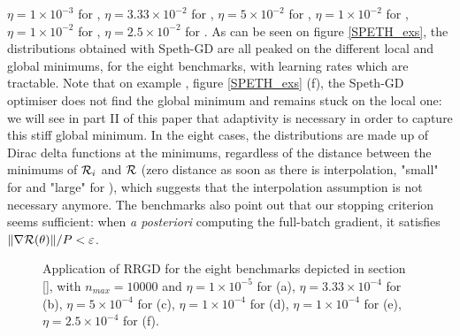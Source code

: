 $\eta = 1\times 10^{-3}$ for \exThree, 
$\eta = 3.33\times 10^{-2}$ for \exFour, 
$\eta = 5 \times 10^{-2}$ for \exFive, 
$\eta = 1 \times 10^{-2}$ for \exSix, 
$\eta = 1 \times 10^{-2}$ for \exSeven, 
$\eta = 2.5 \times 10^{-2}$ for \exHeight. 
As can be seen on figure \ref{SPETH_exs}, the distributions obtained with Speth-GD are all peaked on the different local and global minimums, for the eight benchmarks, with learning
rates which are tractable. Note that on example \exHeight, figure \ref{SPETH_exs} (f), the Speth-GD optimiser does not find the global minimum and remains stuck on the local one:
we will see in part II of this paper that adaptivity is necessary in order to capture this stiff global minimum.  
In the eight cases, the distributions are made up of Dirac delta functions at the minimums, regardless of the distance between the minimums of $\mathcal{R}_i$ and $\mathcal{R}$ (zero distance as
soon as there is interpolation, "small" for \exThree and "large" for \exFour), which suggests that the interpolation assumption is not necessary anymore. 
The benchmarks also point out that
our stopping criterion seems sufficient: when {\em a posteriori} computing the full-batch gradient, it satisfies $\|\nabla \mathcal{R}(\theta)\|/P<\varepsilon$. \\
\begin{figure}[h!]
	\centering
	\scalebox{0.45}{}
	\caption{
          Application of RRGD for the eight benchmarks depicted in section \ref{}, with $n_{max}=10000$ and 
        $\eta = 1\times 10^{-5}$ for \exThree (a), 
  $\eta = 3.33\times 10^{-4}$ for \exFour (b), 
  $\eta = 5 \times 10^{-4}$ for \exFive (c), 
  $\eta = 1 \times 10^{-4}$ for \exSix (d), 
  $\eta = 1 \times 10^{-4}$ for \exSeven (e), 
  $\eta = 2.5 \times 10^{-4}$ for \exHeight (f). 
}
	\label{SGD_exs_001}
\end{figure}


